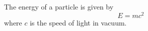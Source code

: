 \documentclass{article}
\begin{document}
The energy of a particle is given by
\[ E = mc^2 \]
where $c$ is the speed of light in vacuum.
\end{document}
